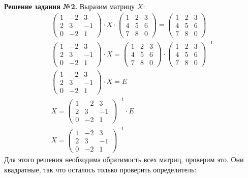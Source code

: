 \documentclass[a4paper, 12pt]{article}
\begin{document}
\textbf{Решение задания №2.} Выразим матрицу $X$:
\begin{gather*}
    \begin{pmatrix}
    1 & -2 & 3 \\ 
    2 & 3 & -1 \\ 
    0 & -2 & 1
\end{pmatrix}
\cdot X \cdot 
\begin{pmatrix}
    1 & 2 & 3 \\ 
    4 & 5 & 6 \\ 
    7 & 8 & 0
\end{pmatrix} = 
\begin{pmatrix}
    1 & 2 & 3 \\ 
    4 & 5 & 6 \\ 
    7 & 8 & 0
\end{pmatrix} \\ 
\begin{pmatrix}
    1 & -2 & 3 \\ 
    2 & 3 & -1 \\ 
    0 & -2 & 1
\end{pmatrix}
\cdot X =  
\begin{pmatrix}
    1 & 2 & 3 \\ 
    4 & 5 & 6 \\ 
    7 & 8 & 0
\end{pmatrix} \cdot 
\begin{pmatrix}
    1 & 2 & 3 \\ 
    4 & 5 & 6 \\ 
    7 & 8 & 0
\end{pmatrix}^{-1} \\ 
\begin{pmatrix}
    1 & -2 & 3 \\ 
    2 & 3 & -1 \\ 
    0 & -2 & 1
\end{pmatrix}
\cdot X =  
E \\ 
X = \begin{pmatrix}
    1 & -2 & 3 \\ 
    2 & 3 & -1 \\ 
    0 & -2 & 1
\end{pmatrix} ^{-1}
\cdot E \\ 
X = \begin{pmatrix}
    1 & -2 & 3 \\ 
    2 & 3 & -1 \\ 
    0 & -2 & 1
\end{pmatrix} ^{-1}
\end{gather*}
Для этого решения необходима обратимость всех матриц, проверим это. Они квадратные, так что осталось только проверить определитель:
\end{document}
